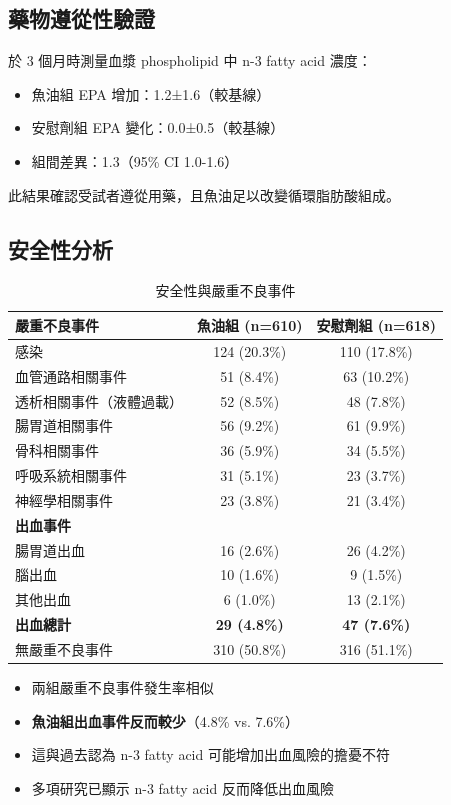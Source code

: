 \documentclass[12pt,a4paper]{article}
\begin{document}
\subsection{藥物遵從性驗證}

於 3 個月時測量血漿 phospholipid 中 n-3 fatty acid 濃度：
\begin{itemize}
    \item 魚油組 EPA 增加：1.2±1.6（較基線）
    \item 安慰劑組 EPA 變化：0.0±0.5（較基線）
    \item 組間差異：1.3（95\% CI 1.0-1.6）
\end{itemize}
此結果確認受試者遵從用藥，且魚油足以改變循環脂肪酸組成。

\subsection{安全性分析}

\begin{longtable}{p{6cm}cc}
\caption{安全性與嚴重不良事件} \\
\toprule
\textbf{嚴重不良事件} & \textbf{魚油組 (n=610)} & \textbf{安慰劑組 (n=618)} \\
\midrule
\endfirsthead

\bottomrule
\endfoot

感染 & 124 (20.3\%) & 110 (17.8\%) \\
血管通路相關事件 & 51 (8.4\%) & 63 (10.2\%) \\
透析相關事件（液體過載） & 52 (8.5\%) & 48 (7.8\%) \\
腸胃道相關事件 & 56 (9.2\%) & 61 (9.9\%) \\
骨科相關事件 & 36 (5.9\%) & 34 (5.5\%) \\
呼吸系統相關事件 & 31 (5.1\%) & 23 (3.7\%) \\
神經學相關事件 & 23 (3.8\%) & 21 (3.4\%) \\
\midrule
\multicolumn{3}{l}{\textbf{出血事件}} \\
腸胃道出血 & 16 (2.6\%) & 26 (4.2\%) \\
腦出血 & 10 (1.6\%) & 9 (1.5\%) \\
其他出血 & 6 (1.0\%) & 13 (2.1\%) \\
\textbf{出血總計} & \textbf{29 (4.8\%)} & \textbf{47 (7.6\%)} \\
\midrule
無嚴重不良事件 & 310 (50.8\%) & 316 (51.1\%) \\
\bottomrule
\end{longtable}

\begin{tcolorbox}[
    colback=emergency_blue!5!white,
    colframe=emergency_blue,
    title=\textbf{安全性重點},
    fonttitle=\bfseries
]
\begin{itemize}
    \item 兩組嚴重不良事件發生率相似
    \item \textbf{魚油組出血事件反而較少}（4.8\% vs. 7.6\%）
    \item 這與過去認為 n-3 fatty acid 可能增加出血風險的擔憂不符
    \item 多項研究已顯示 n-3 fatty acid 反而降低出血風險
\end{itemize}
\end{tcolorbox}
\end{document}
